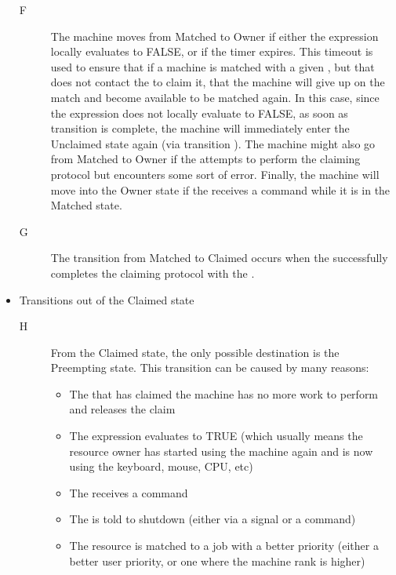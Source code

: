 \begin{itemize}
\begin{description}
\item[F] The machine moves from Matched to Owner if either the
   expression locally evaluates to FALSE, or if the 
   timer expires.
  This timeout is used to ensure that if a machine is matched with a
  given , but that  does not contact the
   to claim it, that the machine will give up on the
  match and become available to be matched again.
  In this case, since the  expression does not locally
  evaluate to FALSE, as soon as transition  is complete, the
  machine will immediately enter the Unclaimed state again (via
  transition ).
  The machine might also go from Matched to Owner if the
   attempts to perform the claiming protocol but
  encounters some sort of error.
  Finally, the machine will move into the Owner state if the
   receives a  command while it is in
  the Matched state.

\item[G] The transition from Matched to Claimed occurs when the
   successfully completes the claiming protocol with
  the .

\end{description}

\item Transitions out of the Claimed state

\begin{description}

\item[H] From the Claimed state, the only possible destination is the
  Preempting state.
  This transition can be caused by many reasons:
  \begin{itemize}
  \item The  that has claimed the machine has no more
    work to perform and releases the claim
  \item The  expression evaluates to TRUE (which usually
    means the resource owner has started using the machine again and
    is now using the keyboard, mouse, CPU, etc)  
  \item The  receives a  command
  \item The  is told to shutdown (either via a signal
    or a  command)
  \item The resource is matched to a job with a better priority
    (either a better user priority, or one where the machine rank is
    higher)
  \end{itemize}


\end{description}
\end{itemize}

